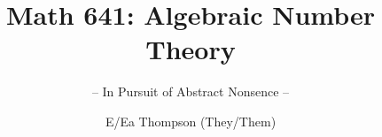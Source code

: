 \documentclass[graybox,envcountchap,sectrefs]{style/svmono}
\begin{document}
\author{E/Ea Thompson (They/Them)}
\title{Math 641: Algebraic Number Theory}
\subtitle{-- In Pursuit of Abstract Nonsence --}
\maketitle

\frontmatter%

% 
% 

% 

\tableofcontents




\mainmatter%
%



\backmatter%
% 
% 
% 
\printindex

\end{document}
